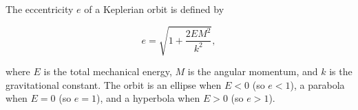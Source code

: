 The eccentricity $e$ of a Keplerian orbit is defined by

$$e = \sqrt{1 + \frac{2EM^2}{k^2}},$$

where $E$ is the total mechanical energy, $M$ is the angular momentum, and $k$ is the gravitational constant. The orbit is an ellipse when $E < 0$ (so $e < 1$), a parabola when $E = 0$ (so $e = 1$), and a hyperbola when $E > 0$ (so $e > 1$).
